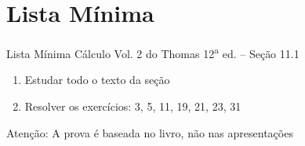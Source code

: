 \documentclass[fleqn,utf8,aspectratio=169,12pt,ignorenonframetext]{beamer}
\begin{document}


\section{Lista Mínima}

\begin{frame}{Lista Mínima}
  Cálculo Vol. 2 do Thomas 12\textsuperscript{a} ed. -- Seção 11.1
  \begin{enumerate}
    \item Estudar todo o texto da seção
    \item Resolver os exercícios: 3, 5, 11, 19, 21, 23, 31
  \end{enumerate}

  \vfill
  Atenção: A prova é baseada no livro, não nas apresentações
\end{frame}

\end{document}
